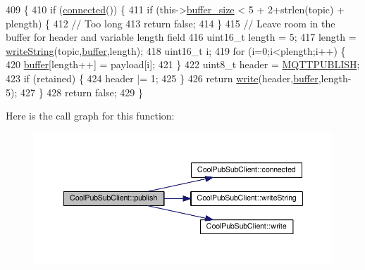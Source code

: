 \begin{DoxyCode}
409                                                                                                            
              \{
410     \textcolor{keywordflow}{if} (\hyperlink{class_cool_pub_sub_client_a3d5a5da4ddb1e5c1bea64d80c665d148}{connected}()) \{
411         \textcolor{keywordflow}{if} (this->\hyperlink{class_cool_pub_sub_client_ae6cb10e42c057483d53516ac830ab526}{buffer\_size} < 5 + 2+strlen(topic) + plength) \{
412             \textcolor{comment}{// Too long}
413             \textcolor{keywordflow}{return} \textcolor{keyword}{false};
414         \}
415         \textcolor{comment}{// Leave room in the buffer for header and variable length field}
416         uint16\_t length = 5;
417         length = \hyperlink{class_cool_pub_sub_client_a0e3d7e776d4cf4427f9569b28868905a}{writeString}(topic,\hyperlink{class_cool_pub_sub_client_a7e8bcc6096626916046a51bebadc7851}{buffer},length);
418         uint16\_t i;
419         \textcolor{keywordflow}{for} (i=0;i<plength;i++) \{
420             \hyperlink{class_cool_pub_sub_client_a7e8bcc6096626916046a51bebadc7851}{buffer}[length++] = payload[i];
421         \}
422         uint8\_t header = \hyperlink{_cool_pub_sub_client_8h_a673aa9dd952b13bf964449d67d21db85}{MQTTPUBLISH};
423         \textcolor{keywordflow}{if} (retained) \{
424             header |= 1;
425         \}
426         \textcolor{keywordflow}{return} \hyperlink{class_cool_pub_sub_client_a7a8e4854a1846eaa668046d3854d47ad}{write}(header,\hyperlink{class_cool_pub_sub_client_a7e8bcc6096626916046a51bebadc7851}{buffer},length-5);
427     \}
428     \textcolor{keywordflow}{return} \textcolor{keyword}{false};
429 \}
\end{DoxyCode}
Here is the call graph for this function\+:\nopagebreak
\begin{figure}[H]
\begin{center}
\leavevmode
\includegraphics[width=350pt]{d8/d4b/class_cool_pub_sub_client_adef968760eb87b70e3fed03e60da76f7_cgraph}
\end{center}
\end{figure}
\mbox{\label{class_cool_pub_sub_client_a55458d47cf01f590e9b6647d5a418ab6}} 
